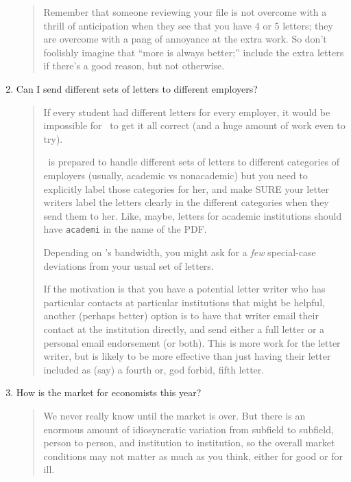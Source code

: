 \documentclass{\classes/econtex}
\begin{document}
\begin{enumerate}
\begin{quote}
      Remember that someone reviewing your file is not overcome with
      a thrill of anticipation when they see that you have 4 or 5 letters; they
      are overcome with a pang of annoyance at the extra work.  So don't foolishly
      imagine that ``more is always better;'' include the extra letters if
      there's a good reason, but not otherwise.


    \end{quote}
  \item  Can I send different sets of letters to different employers?

    \begin{quote}
      If every student had different letters for every employer, it would be impossible for {\JMStaffName}~to get it all correct (and a huge amount of work even to try).

      {\JMStaffName}~is prepared to handle different sets of letters to different categories of employers (usually, academic vs nonacademic) but you need to explicitly label those categories for her, and make SURE your letter writers label the letters clearly in the different categories when they send them to her.  Like, maybe, letters for academic institutions should have \texttt{academi} in the name of the PDF.

      Depending on {\JMStaffName}'s bandwidth, you might ask for a \textit{few} special-case deviations from your usual set of letters.

      If the motivation is that you have a potential letter writer who has particular contacts at particular institutions that might be helpful, another (perhaps better) option is to have that writer email their contact at the institution directly, and send either a full letter or a personal email endorsement (or both).  This is more work for the letter writer, but is likely to be more effective than just having their letter included as (say) a fourth or, god forbid, fifth letter.

    \end{quote}
  \item  How is the market for economists this year?

    \begin{quote}
      We never really know until the market is over.  But there is an enormous amount of idiosyncratic
      variation from subfield to subfield, person to person, and institution to
      institution, so the overall market conditions may not matter as much
      as you think, either for good or for ill.


\end{quote}
\end{enumerate}
\end{document}

